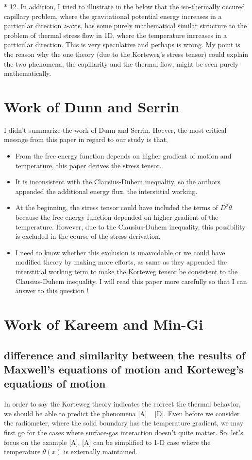 \documentclass[a4paper,12pt]{article}
\begin{document}
  * 12. In addition, I tried to illustrate in the below that the iso-thermally occured capillary problem, where the gravitational potential energy increases in a particular direction $z$-axis, has some purely mathematical similar structure to the problem  of thermal stress flow in 1D, where the temperature increases in a particular direction. This is very speculative and perhaps is wrong. My point is the reason why the one theory (due to the Korteweg's stress tensor) could explain the two phenomena, the capillarity and the thermal flow, might be seen purely mathematically.

\section{Work of Dunn and Serrin}
I didn't summarize the work of Dunn and Serrin. Hoever, the most critical message from this paper in regard to our study is that,
\begin{itemize}
 \item From the free energy function depends on higher gradient of motion and temperature, this paper derives the stress tensor.
 \item It is inconsistent with the Clausius-Duhem inequality, so the authors appended the additional energy flux, the interstitial working.
 \item At the beginning, the stress tensor could have included the terms of $D^2\theta$ because the free energy function depended on higher gradient of the temperature. However, due to the Clausius-Duhem inequality, this possibility is excluded in the course of the stress derivation.
 \item I need to know whether this exclusion is unavoidable or we could have modified theory by making more efforts, as same as they appended the interstitial working term to make the Korteweg tensor be consistent to the Clausius-Duhem inequality. I will read this paper more carefully so that I can answer to this question !
\end{itemize}


\section{Work of Kareem and Min-Gi}
\subsection{difference and similarity between the results of Maxwell's equations of motion and Korteweg's equations of motion}
In order to say the Korteweg theory indicates the correct the thermal behavior, we should be able to predict the phenomena [A] ~ [D]. Even before we consider the radiometer, where the solid boundary has the temperature gradient, we may first go for the cases where surface-gas interaction doesn't quite matter. So, let's focus on the example [A]. [A] can be simplified to 1-D case where the temperature $\theta(x)$ is externally maintained.
\end{document}

